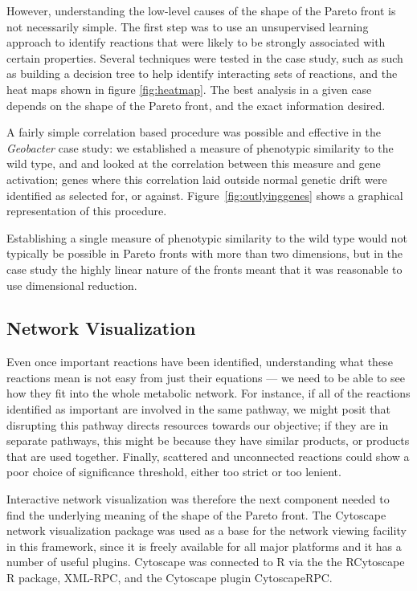 \documentclass[a4paper]{article}
\begin{document}
However, understanding the low-level causes of the shape of the Pareto front is not necessarily simple. The first step was to use an unsupervised learning approach to identify reactions that were likely to be strongly associated with certain properties. Several techniques were tested in the case study, such as such as building a decision tree to help identify interacting sets of reactions, and the heat maps shown in figure \ref{fig:heatmap}. The best analysis in a given case depends on the shape of the Pareto front, and the exact information desired. 

A fairly simple correlation based procedure was possible and effective in the {\it Geobacter} case study: we established a measure of phenotypic similarity to the wild type, and and looked at the correlation between this measure and gene activation; genes where this correlation laid outside normal genetic drift were identified as selected for, or against. Figure~\ref{fig:outlyinggenes} shows a graphical representation of this procedure. 

Establishing a single measure of phenotypic similarity to the wild type would not typically be possible in Pareto fronts with more than two dimensions, but in the case study the highly linear nature of the fronts meant that it was reasonable to use dimensional reduction.

\subsection{Network Visualization}
Even once important reactions have been identified, understanding what these reactions mean is not easy from just their equations --- we need to be able to see how they fit into the whole metabolic network. For instance, if all of the reactions identified as important are involved in the same pathway, we might posit that disrupting this pathway directs resources towards our objective; if they are in separate pathways, this might be because they have similar products, or products that are used together. Finally, scattered and unconnected reactions could show a poor choice of significance threshold, either too strict or too lenient.

Interactive network visualization was therefore the next component needed to find the underlying meaning of the shape of the Pareto front. 
The Cytoscape network visualization package was used as a base for the network viewing facility in this framework, since it is freely available for all major platforms and it has a number of useful plugins. Cytoscape was connected to R via the the RCytoscape R package, XML-RPC, and the Cytoscape plugin CytoscapeRPC.
\end{document}
